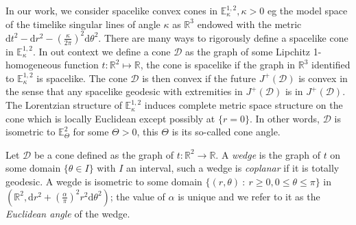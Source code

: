 \documentclass[a4paper,12pt]{article}
\def\D{\mathcal{D}}
\def\E{\mathbf E}
\def\d{\mathrm{d}}
\def\D{\mathcal{D}}
\def\E{\mathbb{E}}
\def\RR{\mathbb{R}}
\newcommand{\mass}[1]{{\mathbb E}^{1,2}_{#1}}
\def\E{\mathbb{E}}
\def\d{\mathrm{d}}
\def\D{\mathcal{D}}
\theoremstyle{definition}
\begin{document}
                
                In our work, we consider spacelike convex cones in $\mass{\kappa},\kappa>0$ eg the model space of the timelike singular lines of angle $\kappa$ as $\RR^3$ endowed with the metric $\d t^2-\d r^2-\left(\frac{\kappa}{2\pi}\right)^2\d \theta^2$.               
                There are many ways to rigorously define a spacelike cone in $\mass{\kappa}$. In out context we define a cone $\D$ as  the graph of some Lipchitz 1-homogeneous function $t : \RR^2 \mapsto \RR$, the cone is spacelike if the graph in $\RR^3$ identified to $\mass{\kappa}$ is spacelike. The cone $\D$ is then convex if the future $J^+(\D)$  is convex in the sense that any spacelike geodesic with extremities in $J^+(\D)$ is in $J^+(\D)$. 
				The Lorentzian structure of $\mass{\kappa}$ induces complete metric space structure on the cone which is locally Euclidean except possibly at $\{r=0\}$. In other words, $\D$ is isometric to $\E^2_\Theta$ for some $\Theta>0$, this $\Theta$ is its so-called cone angle.
				
				
				
				
				
				
			
			
				
				
				
				
				
				Let $\D$ be a cone defined as the graph of $t:\RR^2\rightarrow \RR$. A {\it wedge} is the graph of $t$ on some domain $\{\theta\in I\}$ with $I$ an interval, such a wedge is {\it coplanar} if it is totally geodesic. A wegde is isometric to some domain $\{(r,\theta)~:~r\geq 0, 0\leq \theta \leq \pi \}$ in $(\RR^2,\d r^2+ (\frac{\alpha }{\pi} )^2r^2 \d \theta^2)$; the value of $\alpha$ is unique and we refer to it as the {\it Euclidean angle} of the wedge.
				
\end{document}

